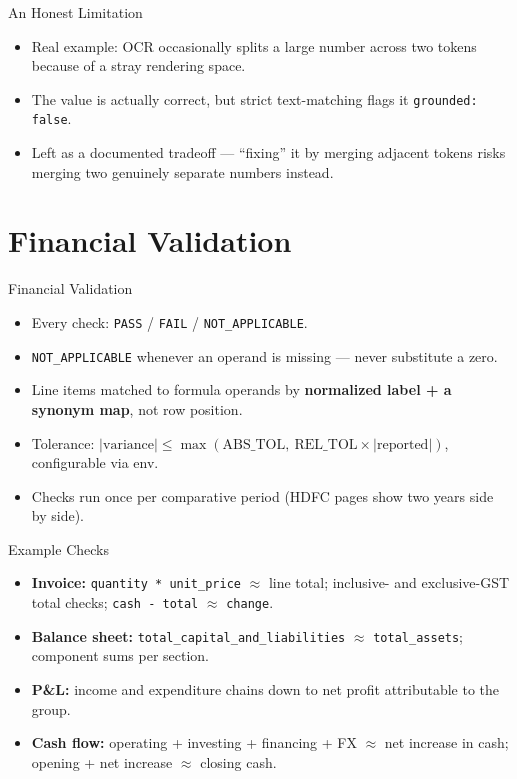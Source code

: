\documentclass[11pt]{beamer}
\begin{document}
\begin{frame}{An Honest Limitation}
  \begin{itemize}
    \item Real example: OCR occasionally splits a large number across two tokens
      because of a stray rendering space.
    \item The value is actually correct, but strict text-matching flags it
      \texttt{grounded: false}.
    \item Left as a documented tradeoff --- ``fixing'' it by merging adjacent tokens
      risks merging two genuinely separate numbers instead.
  \end{itemize}
\end{frame}

\section{Financial Validation}
\begin{frame}{Financial Validation}
  \begin{itemize}
    \item Every check: \texttt{PASS} / \texttt{FAIL} / \texttt{NOT\_APPLICABLE}.
    \item \texttt{NOT\_APPLICABLE} whenever an operand is missing --- never
      substitute a zero.
    \item Line items matched to formula operands by \textbf{normalized label + a
      synonym map}, not row position.
    \item Tolerance: $|\text{variance}| \le \max(\text{ABS\_TOL},\ \text{REL\_TOL}
      \times |\text{reported}|)$, configurable via env.
    \item Checks run once per comparative period (HDFC pages show two years side by
      side).
  \end{itemize}
\end{frame}

\begin{frame}{Example Checks}
  \begin{itemize}
    \item \textbf{Invoice:} \texttt{quantity * unit\_price} $\approx$ line total;
      inclusive- and exclusive-GST total checks; \texttt{cash - total} $\approx$
      \texttt{change}.
    \item \textbf{Balance sheet:} \texttt{total\_capital\_and\_liabilities} $\approx$
      \texttt{total\_assets}; component sums per section.
    \item \textbf{P\&L:} income and expenditure chains down to net profit
      attributable to the group.
    \item \textbf{Cash flow:} operating + investing + financing + FX $\approx$ net
      increase in cash; opening + net increase $\approx$ closing cash.
  \end{itemize}
\end{frame}
\end{document}
